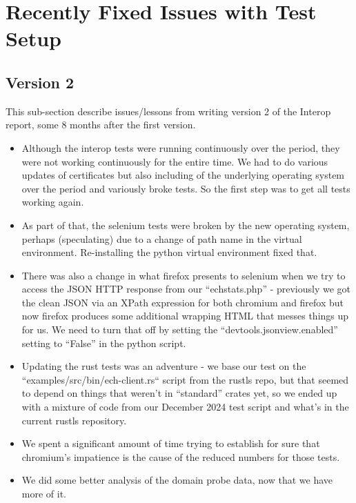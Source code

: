 \section{Recently Fixed Issues with Test Setup}
\label{app:alongtheway}

\subsection{Version 2}

This sub-section describe issues/lessons from writing version 2 of
the Interop report, some 8 months after the first version.

\begin{itemize}

\item Although the interop tests were running continuously over the period,
    they were not working continuously for the entire time. We had to do
        various updates of certificates but also including of the underlying
        operating system over the period and variously broke tests. So the
        first step was to get all tests working again.

\item As part of that, the selenium tests were broken by the new operating
    system, perhaps (speculating) due to a change of path name in the virtual
        environment. Re-installing the python virtual environment fixed that.

\item There was also a change in what firefox presents to selenium when we
    try to access the JSON HTTP response from our ``echstats.php'' -
        previously we got the clean JSON via an XPath
        expression for both chromium and firefox but now firefox produces
        some additional wrapping HTML that messes things up for us. We need
        to turn that off by setting the ``devtools.jsonview.enabled'' setting
        to ``False'' in the python script.

\item Updating the rust tests was an adventure - we base our test on the
    ``examples/src/bin/ech-client.rs`` script from the rustls repo, but 
        that seemed to depend on things that weren't in ``standard'' crates
        yet, so we ended up with a mixture of code from our December 2024
        test script and what's in the current rustls repository.

\item We spent a significant amount of time trying to establish for
    sure that chromium's impatience is the cause of the reduced numbers
    for those tests.

\item We did some better analysis of the domain probe data, now that we
    have more of it.

\end{itemize}

